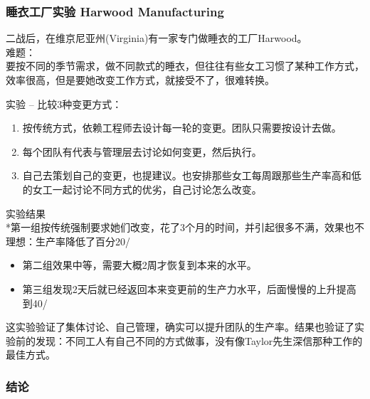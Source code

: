 \hypertarget{ux7761ux8863ux5de5ux5382ux5b9eux9a8c-harwood-manufacturing}{%
\subsubsection{睡衣工厂实验 Harwood
Manufacturing}\label{ux7761ux8863ux5de5ux5382ux5b9eux9a8c-harwood-manufacturing}}

二战后，在维京尼亚州(Virginia)有一家专门做睡衣的工厂Harwood。\\
难题：\\
要按不同的季节需求，做不同款式的睡衣，但往往有些女工习惯了某种工作方式，效率很高，但是要她改变工作方式，就接受不了，很难转换。

实验 -- 比较3种变更方式：\\

\begin{enumerate}
\tightlist
\item
  按传统方式，依赖工程师去设计每一轮的变更。团队只需要按设计去做。
\item
  每个团队有代表与管理层去讨论如何变更，然后执行。
\item
  自己去策划自己的变更，也提建议。也安排那些女工每周跟那些生产率高和低的女工一起讨论不同方式的优劣，自己讨论怎么改变。
\end{enumerate}

实验结果\\
*第一组按传统强制要求她们改变，花了3个月的时间，并引起很多不满，效果也不理想：生产率降低了百分20/%

\begin{itemize}
\tightlist
\item
  第二组效果中等，需要大概2周才恢复到本来的水平。
\item
  第三组发现2天后就已经返回本来变更前的生产力水平，后面慢慢的上升提高到40/%
\end{itemize}

这实验验证了集体讨论、自己管理，确实可以提升团队的生产率。结果也验证了实验前的发现：不同工人有自己不同的方式做事，没有像Taylor先生深信那种工作的最佳方式。\\

\hypertarget{ux7ed3ux8bba}{%
\subsubsection{结论}\label{ux7ed3ux8bba}}

